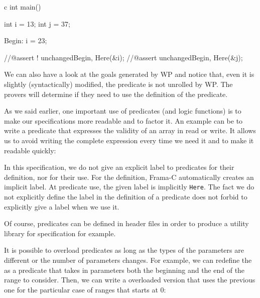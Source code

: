 \begin{CodeBlock}{c}
int main(){
  int i = 13;
  int j = 37;

 Begin:
  i = 23;
 
  //@assert ! unchanged{Begin, Here}(&i);
  //@assert   unchanged{Begin, Here}(&j);
}
\end{CodeBlock}



We can also have a look at the goals generated by WP and notice that,
even it is slightly (syntactically) modified, the predicate is not
unrolled by WP. The provers will determine if they need to use the
definition of the predicate.

As we said earlier, one important use of predicates (and logic
functions) is to make our specifications more readable and to factor it.
An example can be to write a predicate that expresses the validity of an
array in read or write. It allows us to avoid writing the complete
expression every time we need it and to make it readable quickly:






In this specification, we do not give an explicit label to predicates
for their definition, nor for their use. For the definition, Frama-C
automatically creates an implicit label. At predicate use, the given
label is implicitly \texttt{Here}. The fact we do not explicitly define
the label in the definition of a predicate does not forbid to explicitly
give a label when we use it.

Of course, predicates can be defined in header files in order to produce
a utility library for specification for example.






It is possible to overload predicates as long as the types of the
parameters are different or the number of parameters changes. For
example, we can redefine the  as a
predicate that takes in parameters both the beginning and the end
of the range to consider. Then, we can write a overloaded version that
uses the previous one for the particular case of ranges that starts
at 0:








